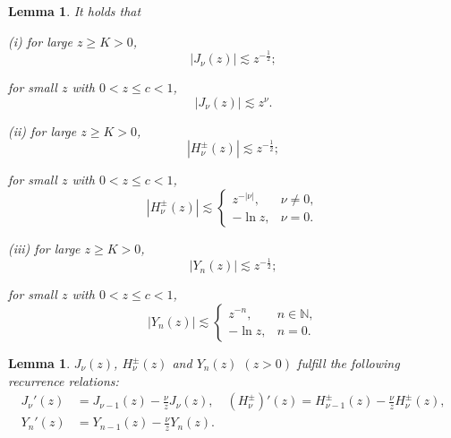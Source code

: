 \documentclass[11pt,twoside]{article}
\newcommand{\N}{\mathbb N}
\newcommand{\f}{\frac}
\theoremstyle{plain}
\newtheorem{lemma}[theorem]{Lemma}
\theoremstyle{definition}
\theoremstyle{remark}
\numberwithin{equation}{section}
\begin{document}
\begin{lemma}\label{lem1}
It holds that

(i) for large $z\geq K > 0$,
\begin{equation}\label{equ:q14}
|J_{\nu}(z)|\lesssim z^{-\f{1}{2}};
\end{equation}

\quad for small $z$ with $0<z\leq c<1$,
\begin{equation}\label{equ:q15}
|J_{\nu}(z)|\lesssim z^{\nu}.
\end{equation}

(ii) for large $z\geq K > 0$,
\begin{equation}\label{equ:q12}
|H_{\nu}^{\pm}(z)|\lesssim z^{-\f{1}{2}};
\end{equation}

\quad for small $z$ with $0<z\leq c<1$,
\begin{equation}\label{equ:q13}
\left|H_{\nu}^{ \pm}(z)\right| \lesssim \begin{cases}z^{-|\nu|}, & \nu \neq 0, \\
-\ln z, & \nu=0.
\end{cases}
\end{equation}

(iii) for large $z\geq K > 0$,
\begin{equation}\label{equ:q14-1}
|Y_{n}(z)|\lesssim z^{-\f{1}{2}};
\end{equation}

\quad for small $z$ with $0<z\leq c<1$,
\begin{equation}\label{equ:q15-1}
|Y_{n}(z)| \lesssim \begin{cases}z^{-n}, & n \in \N, \\
-\ln z, & n=0.
\end{cases}
\end{equation}
\end{lemma}

\begin{lemma}\label{lem1-1}
$J_{\nu}(z)$, $H_{\nu}^{\pm}(z)$ and $Y_{n}(z)$ $(z>0)$ fulfill the following recurrence relations:
\begin{equation}\label{equ:q15-11}
\begin{aligned}
J_{\nu}'(z)
&=J_{\nu-1}(z)-\f{\nu}{z}J_{\nu}(z),\quad
(H_{\nu}^{\pm})'(z)
=H_{\nu-1}^{\pm}(z)-\f{\nu}{z}H_{\nu}^{\pm}(z),\\
Y_{n}'(z)
&=Y_{n-1}(z)-\f{\nu}{z}Y_{n}(z).
\end{aligned}
\end{equation}

\end{lemma}
\end{document}
